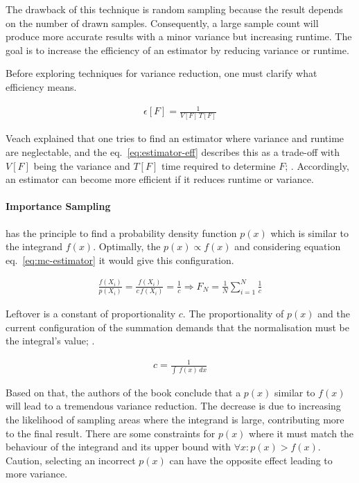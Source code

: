 The drawback of this technique is random sampling because the result depends on the number of drawn samples.
Consequently, a large sample count will produce more accurate results with a minor variance but increasing runtime.
The goal is to increase the efficiency of an estimator by reducing variance or runtime.

Before exploring techniques for variance reduction, one must clarify what efficiency means.

\begin{align}
\epsilon[F]=\frac{1}{V[F]\,T[F]}
\label{eq:estimator-eff}
\end{align}

Veach explained that one tries to find an estimator where variance and runtime are neglectable, and the eq.~\ref{eq:estimator-eff} describes this as a trade-off with $V[F]$ being the variance and $T[F]$ time required to determine $F$; \cite{veach_robust_1997}.
Accordingly, an estimator can become more efficient if it reduces runtime or variance.

\paragraph{Importance Sampling} has the principle to find a probability density function $p(x)$ which is similar to the integrand $f(x)$.
Optimally, the $p(x) \propto f(x)$ and considering equation eq.~\ref{eq:mc-estimator} it would give this configuration.

\begin{align*}
\frac{f(X_i)}{p(X_i)}=\frac{f(X_i)}{c\,f(X_i)}=\frac{1}{c} \Rightarrow F_N=\frac{1}{N}\sum_{i=1}^{N}\frac{1}{c}
\end{align*}

Leftover is a constant of proportionality $c$.
The proportionality of $p(x)$ and the current configuration of the summation demands that the normalisation must be the integral's value; \cite{veach_robust_1997}.

\begin{align*}
c=\frac{1}{\int\,f(x)\,dx}
\end{align*}

Based on that, the authors of the book \cite{kalos_monte_2008} conclude that a $p(x)$ similar to $f(x)$ will lead to a tremendous variance reduction.
The decrease is due to increasing the likelihood of sampling areas where the integrand is large, contributing more to the final result.
There are some constraints for $p(x)$ where it must match the behaviour of the integrand and its upper bound with $\forall x : p(x) > f(x)$.
Caution, selecting an incorrect $p(x)$ can have the opposite effect leading to more variance.

